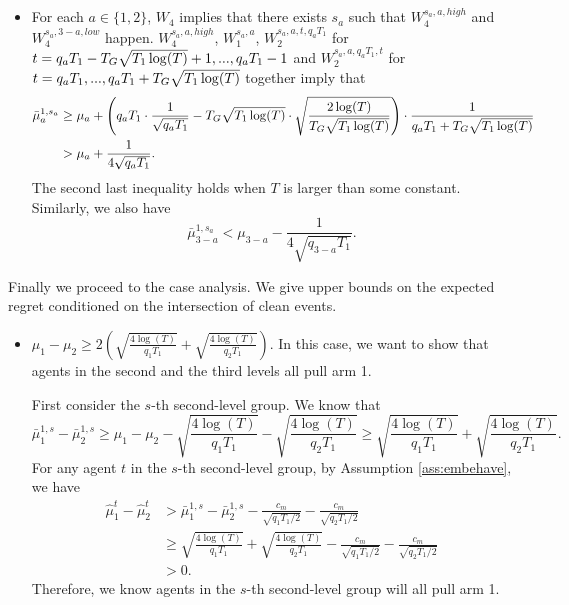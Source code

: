 {\begin{itemize}
If there are at least $T_2$ pulls of arm $a$ in the first two levels, 
\[
|\bar{\mu}_a-\mu_a| \leq \sqrt{\frac{2\log(T)}{T_2}}. 
\]

\item For each $a \in \{1,2\}$, $W_4$ implies that there exists $s_a$ such that $W_4^{s_a,a,high}$ and $W_4^{s_a,3-a,low}$ happen. $W_4^{s_a,a,high}$,  $W_1^{s_a,a}$, $W_2^{s_a,a,t, q_aT_1}$ for $t = q_a T_1- T_G \sqrt{T_1\log(T)}+1, ...,q_aT_1-1$ and $W_2^{s_a,a,q_aT_1,t}$ for $t= q_aT_1,...,q_a T_1+ T_G \sqrt{T_1\log(T)}$ together imply that 
\begin{align*}
\bar{\mu}_a ^{1,s_a} &\geq \mu_a + \left(q_aT_1 \cdot \frac{1}{\sqrt{q_aT_1}} - T_G \sqrt{T_1\log(T)} \cdot \sqrt{\frac{2\log(T)}{ T_G \sqrt{T_1\log(T)}}} \right) \cdot \frac{1}{q_a T_1+ T_G \sqrt{T_1\log(T)}} \\
&> \mu_a + \frac{1}{4\sqrt{q_aT_1}}.
\end{align*}
The second last inequality holds when $T$ is larger than some constant.
Similarly, we also have
\[
\bar{\mu}_{3-a} ^{1,s_a} < \mu_{3-a}   - \frac{1}{4\sqrt{q_{3-a} T_1}}.
\]
\end{itemize}

Finally we proceed to the case analysis. We give upper bounds on the expected regret conditioned on the intersection of clean events.

\begin{itemize}

\item $\mu_1 - \mu_2 \geq 2\left(\sqrt{\frac{4\log(T)}{q_1T_1}} 
+ \sqrt{\frac{4\log(T)}{q_2T_1}}\right)$. In this case, we want to show that agents in the second and the third levels all pull arm 1. 

First consider the $s$-th second-level group. We know that 
\[
\bar{\mu}_1^{1,s} - \bar{\mu}_2^{1,s} \geq \mu_1 -\mu_2 - \sqrt{\frac{4\log(T)}{q_1T_1}} - \sqrt{\frac{4\log(T)}{q_2T_1}} \geq  \sqrt{\frac{4\log(T)}{q_1T_1}} + \sqrt{\frac{4\log(T)}{q_2T_1}}.
\]
For any agent $t$ in the $s$-th second-level group, by Assumption \ref{ass:embehave}, we have
\begin{align*}
\hat{\mu}_1^t - \hat{\mu}_2^t &>\bar{\mu}_1^{1,s} - \bar{\mu}_2^{1,s} - \frac{c_m}{\sqrt{q_1T_1/2}} - \frac{c_m}{\sqrt{q_2T_1/2}}\\
&\geq  \sqrt{\frac{4\log(T)}{q_1T_1}} + \sqrt{\frac{4\log(T)}{q_2T_1}}- \frac{c_m}{\sqrt{q_1T_1/2}} - \frac{c_m}{\sqrt{q_2T_1/2}}\\
 &> 0.
\end{align*}
Therefore, we know agents in the $s$-th second-level group will all pull arm 1.


\end{itemize}}
